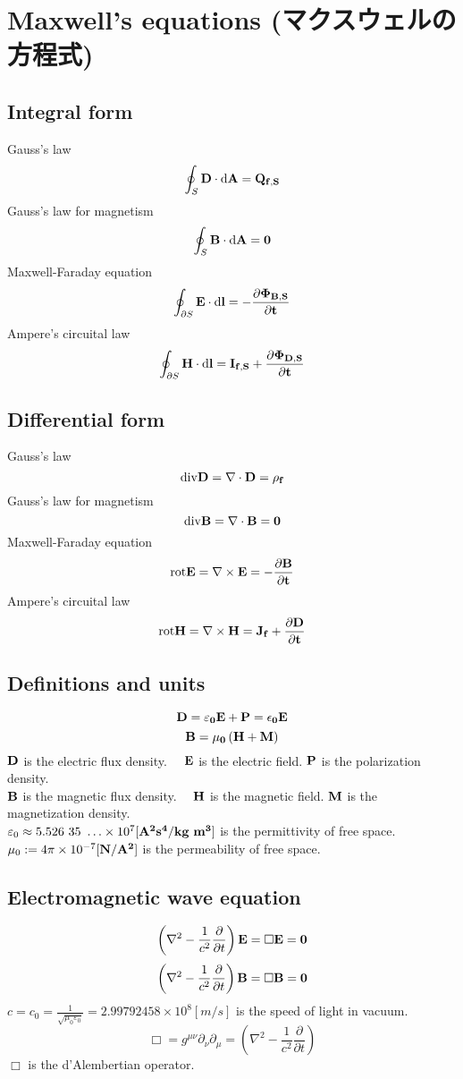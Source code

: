 \section{Maxwell's equations (マクスウェルの方程式)}


\subsection{Integral form}
Gauss's law
\[ \oint_{S} \bf{D} \cdot \rm{d} \bf{A} = Q_{f,S} \]
Gauss's law for magnetism
\[ \oint_{S} \bf{B} \cdot \rm{d} \bf{A} = 0 \]
Maxwell-Faraday equation
\[ \oint_{\partial S} \bf{E} \cdot \rm{d} \bf{l} = - \frac {\partial \Phi_{B,S}}{\partial t} \]
Ampere's circuital law
\[ \oint_{\partial S} \bf{H} \cdot \rm{d} \bf{l} = I_{f,S} + \frac {\partial \Phi_{D,S}}{\partial t} \]

\subsection{Differential form}
Gauss's law
\[ \rm{div} \bf{D} = \nabla \cdot \bf{D} = {\rho}_{f} \]
Gauss's law for magnetism
\[ \rm{div} \bf{B} = \nabla \cdot \bf{B} = 0 \]
Maxwell-Faraday equation
\[ \rm{rot} \bf{E} = \nabla \times \bf{E} = - \frac{ \partial \bf{B} }{ \partial t} \]
Ampere's circuital law
\[ \rm{rot} \bf{H} = \nabla \times \bf{H} = \bf{J}_{f} + \frac{ \partial \bf{D} }{ \partial t} \]

\subsection{Definitions and units}
\[ \bf{D} = {\varepsilon}_{0} \bf{E} + \bf{P} = {\epsilon}_{0} \bf{E} \]
\[ \bf{B} = {\mu}_{0} \left( \bf{H} + \bf{M} \right) \]
$\bf{D}$ is the electric flux density. \ \ $ \bf{E} $ is the electric field. $ \bf{P} $ is the polarization density.\\
$\bf{B}$ is the magnetic flux density. \ \ $ \bf{H} $ is the magnetic field. $ \bf{M} $ is the magnetization density.\\
$ {\varepsilon}_{0} \approx  5.526\ 35\ \ldots \times 10^{7} [ \bf{A}^{2} s^{4} / kg \  m^{3} ] $ is the permittivity of free space.\\
$ {\mu}_{0} := 4\pi\times 10^{-7} [ \bf{N} / \bf{A}^{2} ] $ is the permeability of free space.\\

\subsection{Electromagnetic wave equation}

\[ \left( {\nabla}^2 - \frac{ 1 }{ c^2 } \frac{ \partial }{ \partial t} \right) \bf{E} = \Box \bf{E} = 0 \]
\[ \left( {\nabla}^2 - \frac{ 1 }{ c^2 } \frac{ \partial }{ \partial t} \right) \bf{B} = \Box \bf{B} = 0 \]
$ c = c_0 = { \frac{ 1 }{ \sqrt{ \mu_0 \varepsilon_0 } } } = 2.99792458 \times 10^8 [ m / s ] $ is the speed of light in vacuum.\\
\[ \Box = g^{\mu\nu} \partial_\nu \partial_\mu = \left( {\nabla}^2 - \frac{ 1 }{ c^2 } \frac{ \partial }{ \partial t} \right) \]
$ \Box $ is the d'Alembertian operator.